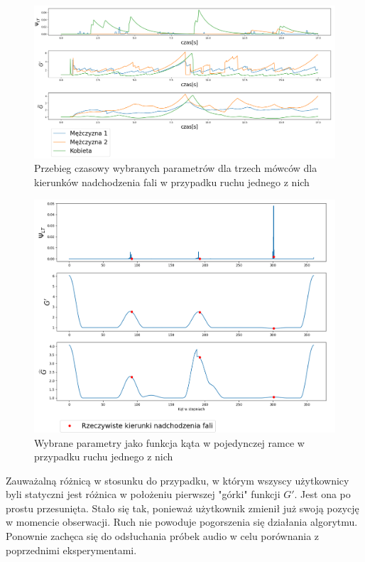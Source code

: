 \begin{figure}[h!]
    \centering
    \includegraphics[width=\textwidth]{Images/moving_params_in_time.png}
    \caption{Przebieg czasowy wybranych parametrów dla trzech mówców dla kierunków nadchodzenia fali w przypadku ruchu jednego z nich}
    \label{fig:moving_params_in_time}
\end{figure}

\begin{figure}[h!]
    \centering
    \includegraphics[width=\textwidth]{Images/moving_params_in_angle.png}
    \caption{Wybrane parametry jako funkcja kąta w pojedynczej ramce w przypadku ruchu jednego z nich}
    \label{fig:moving_params_in_angle}
\end{figure}

Zauważalną różnicą w stosunku do przypadku, w którym wszyscy użytkownicy byli statyczni jest różnica w położeniu pierwszej "górki" funkcji $G'$. Jest ona po prostu przesunięta. Stało się tak, ponieważ użytkownik zmienił już swoją pozycję w momencie obserwacji. Ruch nie powoduje pogorszenia się działania algorytmu. Ponownie zachęca się do odsłuchania próbek audio w celu porównania z poprzednimi eksperymentami.



